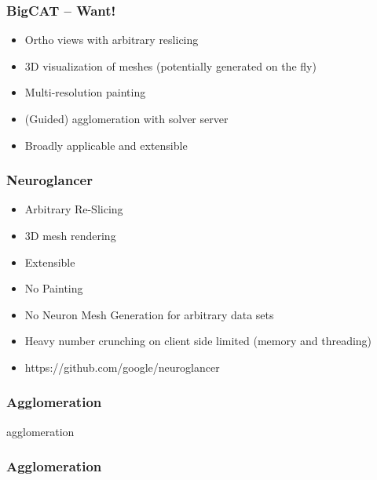 \documentclass[aspectratio=169]{beamer}
\begin{document}
\begin{frame}
    \frametitle{BigCAT -- Want!}
    \begin{itemize}
          \item Ortho views with arbitrary reslicing
          \item 3D visualization of meshes (potentially generated on the fly)
          \item Multi-resolution painting
          \item (Guided) agglomeration with solver server
          \item Broadly applicable and extensible
    \end{itemize}
\end{frame} 

\begin{frame}
    \frametitle{Neuroglancer}
    \begin{itemize}
          \item Arbitrary Re-Slicing
          \item 3D mesh rendering
          \item Extensible
          \item No Painting
          \item No Neuron Mesh Generation for arbitrary data sets 
          \item Heavy number crunching on client side limited (memory and threading) 
          \item https://github.com/google/neuroglancer
    \end{itemize}
\end{frame}

\begin{frame}
    \frametitle{Agglomeration}
    {agglomeration}
\end{frame}

\begin{frame}
    \frametitle{Agglomeration}
\end{frame}
\end{document}
